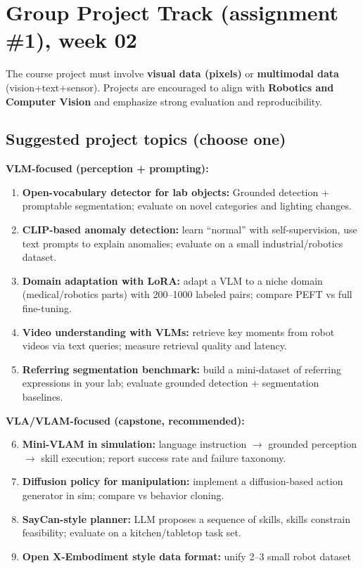 \documentclass[a4paper,11pt]{texMemo}
\begin{document}
\section{Group Project Track (assignment \#1), week 02}
The course project must involve \textbf{visual data (pixels)} or \textbf{multimodal data} (vision+text+sensor).
Projects are encouraged to align with \textbf{Robotics and Computer Vision} and emphasize strong evaluation and reproducibility.

\subsection*{Suggested project topics (choose one)}
\textbf{VLM-focused (perception + prompting):}
\begin{enumerate}
\item \textbf{Open-vocabulary detector for lab objects:} Grounded detection + promptable segmentation; evaluate on novel categories and lighting changes.
\item \textbf{CLIP-based anomaly detection:} learn ``normal'' with self-supervision, use text prompts to explain anomalies; evaluate on a small industrial/robotics dataset.
\item \textbf{Domain adaptation with LoRA:} adapt a VLM to a niche domain (medical/robotics parts) with 200--1000 labeled pairs; compare PEFT vs full fine-tuning.
\item \textbf{Video understanding with VLMs:} retrieve key moments from robot videos via text queries; measure retrieval quality and latency.
\item \textbf{Referring segmentation benchmark:} build a mini-dataset of referring expressions in your lab; evaluate grounded detection + segmentation baselines.

\end{enumerate}

\textbf{VLA/VLAM-focused (capstone, recommended):}
\begin{enumerate}
\setcounter{enumi}{5}
\item \textbf{Mini-VLAM in simulation:} language instruction $\rightarrow$ grounded perception $\rightarrow$ skill execution; report success rate and failure taxonomy.
\item \textbf{Diffusion policy for manipulation:} implement a diffusion-based action generator in sim; compare vs behavior cloning.
\item \textbf{SayCan-style planner:} LLM proposes a sequence of skills, skills constrain feasibility; evaluate on a kitchen/tabletop task set.
\item \textbf{Open X-Embodiment style data format:} unify 2--3 small robot dataset
\end{enumerate}
\end{document}
